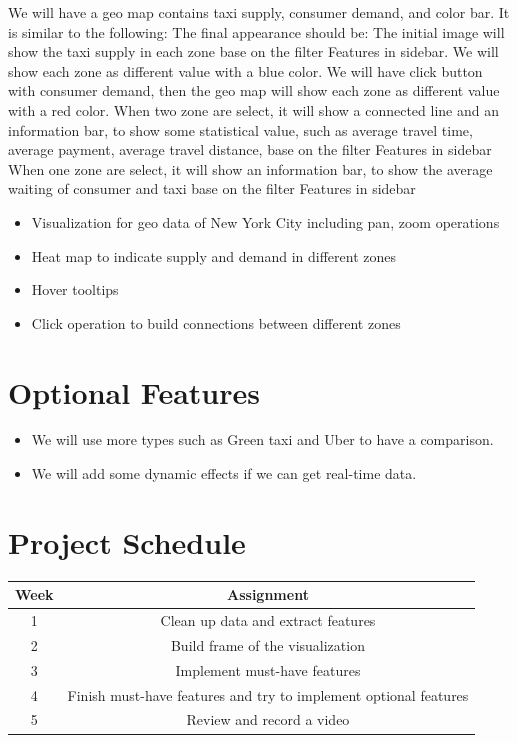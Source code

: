 \documentclass{article}
\begin{document}
        We will have a geo map contains taxi supply,  consumer demand, and color bar. It is similar to the following:
            The final appearance should be:
            The initial image will show the taxi supply in each zone base on the filter Features in sidebar. We will show each zone as different value with a blue color.
            We will have click button with consumer demand, then the geo map will show each zone as different value with a red color.
            When two zone are select, it will show a connected line and an information bar, to show some statistical value, such as average travel time, average payment, average travel distance, base on the filter Features in sidebar
            When one zone are select, it will show an information bar, to show the average waiting of consumer and taxi base on the filter Features in sidebar
            \begin{itemize}
                \item Visualization for geo data of New York City including pan, zoom operations
                \item Heat map to indicate supply and demand in different zones
                \item Hover tooltips
                \item Click operation to build connections between different zones
            \end{itemize}
 
        \section{Optional Features}
        \begin{itemize}
            \item We will use more types such as Green taxi and Uber to have a comparison.
            \item We will add some dynamic effects if we can get real-time data.
        \end{itemize}
        

        \section{Project Schedule}
            \begin{tabular}{cc}
                \hline
                Week & Assignment \\ \hline
                1& Clean up data and extract features \\
                2& Build frame of the visualization \\
                3& Implement must-have features \\
                4& Finish must-have features and try to implement optional features \\
                5& Review and record a video \\
                \hline

            \end{tabular}
        
\end{document}
